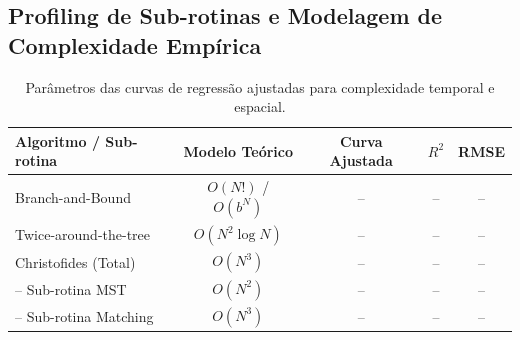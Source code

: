 \documentclass[12pt]{article}
\begin{document}
\begin{table}[H]
\centering
\caption{Resumo comparativo de tempo de execução (s) e \textit{gap} de otimalidade (\%) nas instâncias selecionadas da TSPLIB (limite de 1800s para métodos exatos).}
\label{tab:resultados_gerais}
\end{table}

\subsection{Profiling de Sub-rotinas e Modelagem de Complexidade Empírica}

\begin{table}[H]
\centering
\caption{Parâmetros das curvas de regressão ajustadas para complexidade temporal e espacial.}
\label{tab:regressao_complexidade}
\begin{tabular}{@{}lcccc@{}}
\toprule
\textbf{Algoritmo / Sub-rotina} & \textbf{Modelo Teórico} & \textbf{Curva Ajustada} & \textbf{$R^2$} & \textbf{RMSE} \\ \midrule
Branch-and-Bound & $O(N!)$ / $O(b^N)$ & -- & -- & -- \\
Twice-around-the-tree & $O(N^2 \log N)$ & -- & -- & -- \\
Christofides (Total) & $O(N^3)$ & -- & -- & -- \\
\quad -- Sub-rotina MST & $O(N^2)$ & -- & -- & -- \\
\quad -- Sub-rotina Matching & $O(N^3)$ & -- & -- & -- \\
\bottomrule
\end{tabular}
\end{table}
\end{document}
